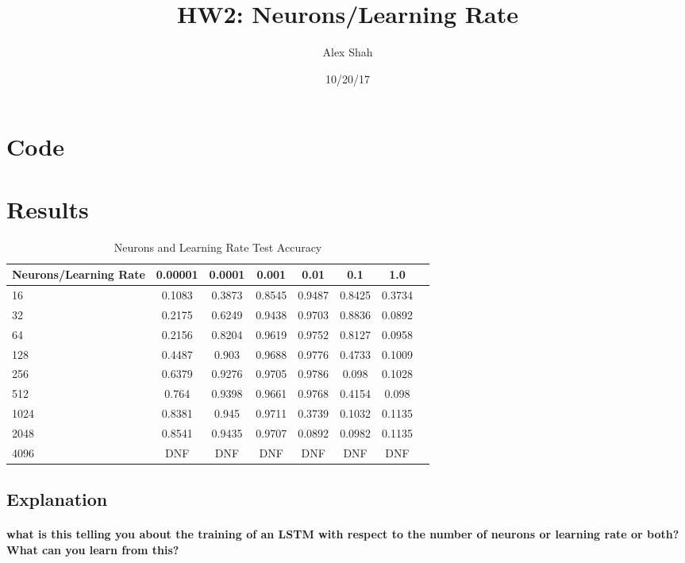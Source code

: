 \documentclass[10pt,a4paper]{report}
\title{HW2: Neurons/Learning Rate}
\author{Alex Shah}
\date{10/20/17}
\begin{document}
\lstset{language=Python}
\maketitle

\section{Code}



\clearpage

\section{Results}

\begin{table}[h]
 \caption{Neurons and Learning Rate Test Accuracy}
 \label{tbl:aTable}
 \begin{center}
  \begin{tabular}{lccccccr}
    \hline 
    Neurons/Learning Rate & 0.00001 & 0.0001 & 0.001 & 0.01 & 0.1 & 1.0  \\
    \hline
    16 & 0.1083 & 0.3873 & 0.8545 & 0.9487 & 0.8425 & 0.3734 \\
    32 & 0.2175 & 0.6249 & 0.9438 & 0.9703 & 0.8836 & 0.0892 \\
    64 & 0.2156 & 0.8204 & 0.9619 & 0.9752 & 0.8127 & 0.0958 \\
    128 & 0.4487 & 0.903 & 0.9688 & 0.9776 & 0.4733 & 0.1009 \\
    256 & 0.6379 & 0.9276 & 0.9705 & 0.9786 & 0.098 & 0.1028 \\
    512 & 0.764 & 0.9398 & 0.9661 & 0.9768 & 0.4154 & 0.098 \\
    1024 & 0.8381 & 0.945 & 0.9711 & 0.3739 & 0.1032 & 0.1135 \\
    2048 & 0.8541 & 0.9435 & 0.9707 & 0.0892 & 0.0982 & 0.1135 \\
    4096 & DNF & DNF & DNF & DNF & DNF & DNF \\
    \hline 
  \end{tabular}
 \end{center}
\end{table}

\subsection{Explanation}

\paragraph{what is this telling you about the training of an LSTM with respect to the number of neurons or learning rate or both? What can you learn from this?}
\end{document}
